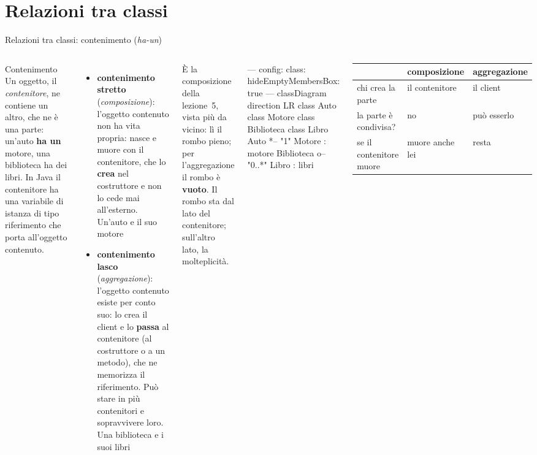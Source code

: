\documentclass[10pt,aspectratio=169]{beamer}
\begin{document}
\section{Relazioni tra classi}

\begin{frame}[fragile]{Relazioni tra classi: contenimento (\emph{ha-un})}
\begin{columns}[T]
\begin{block}{Contenimento}
\small Un oggetto, il \emph{contenitore}, ne contiene un altro, che ne è una parte: un'auto \textbf{ha un} motore, una biblioteca ha dei libri. In Java il contenitore ha una variabile di istanza di tipo riferimento che porta all'oggetto contenuto.
\end{block}
\footnotesize
\begin{itemize}\itemsep=3pt
    \item \textbf{contenimento stretto} (\emph{composizione}): l'oggetto contenuto non ha vita propria: nasce e muore con il contenitore, che lo \textbf{crea} nel costruttore e non lo cede mai all'esterno. Un'auto e il suo motore
    \item \textbf{contenimento lasco} (\emph{aggregazione}): l'oggetto contenuto esiste per conto suo: lo crea il client e lo \textbf{passa} al contenitore (al costruttore o a un metodo), che ne memorizza il riferimento. Può stare in più contenitori e sopravvivere loro. Una biblioteca e i suoi libri
\end{itemize}
\vspace{0.05cm}
È la composizione della lezione~5, vista più da vicino: lì il rombo pieno; per l'aggregazione il rombo è \textbf{vuoto}. Il rombo sta dal lato del contenitore; sull'altro lato, la molteplicità.

\begin{mermaid}
---
config:
  class:
    hideEmptyMembersBox: true
---
classDiagram
  direction LR
  class Auto
  class Motore
  class Biblioteca
  class Libro
  Auto *-- "1" Motore : motore
  Biblioteca o-- "0..*" Libro : libri
\end{mermaid}
\begin{center}
\scriptsize
\renewcommand{\arraystretch}{1.15}
\begin{tabular}{@{}lll@{}}
\toprule
 & \textbf{composizione} & \textbf{aggregazione} \\
\midrule
chi crea la parte & il contenitore & il client \\
la parte è condivisa? & no & può esserlo \\
se il contenitore muore & muore anche lei & resta \\
\bottomrule
\end{tabular}
\end{center}
\end{columns}
\end{frame}
\end{document}
